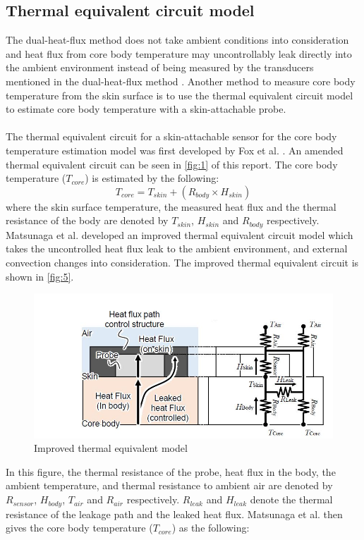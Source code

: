 \subsection{Thermal equivalent circuit model}
The dual-heat-flux method does not take ambient conditions into consideration and heat flux from core body temperature may uncontrollably leak directly into the ambient environment instead of being measured by the transducers mentioned in the dual-heat-flux method \cite{Matsunaga2020}. Another method to measure core body temperature from the skin surface is to use the thermal equivalent circuit model to estimate core body temperature with a skin-attachable probe. 
\\
\\
The thermal equivalent circuit for a skin-attachable sensor for the core body temperature estimation model was first developed by Fox et al. \cite{Fox1973}. An amended thermal equivalent circuit can be seen in \autoref{fig:1} of this report. The core body temperature ($T_{core}$) is estimated by the following:
\begin{equation}
	T_{core} = T_{skin} + (R_{body} \times H_{skin})
\end{equation}
where the skin surface temperature, the measured heat flux and the thermal resistance of the body are denoted by $T_{skin}$, $H_{skin}$ and $R_{body}$ respectively. Matsunaga et al. \cite{Matsunaga2020} developed an improved thermal equivalent circuit model which takes the uncontrolled heat flux leak to the ambient environment, and external convection changes into consideration. The improved thermal equivalent circuit is shown in \autoref{fig:5}.
\begin{figure}[H]
	\centering
	\includegraphics[scale=0.6]{img/improved-temp-model}
	\caption{Improved thermal equivalent model \cite{Matsunaga2020}}
	\label{fig:5}
\end{figure}
\noindent
In this figure, the thermal resistance of the probe, heat flux in the body, the ambient temperature, and thermal resistance to ambient air are denoted by $R_{sensor}$, $H_{body}$, $T_{air}$ and $R_{air}$ respectively. $R_{leak}$ and $H_{leak}$ denote the thermal resistance of the leakage path and the leaked heat flux. Matsunaga et al. \cite{Matsunaga2020} then gives the core body temperature ($T_{core}$) as the following:
